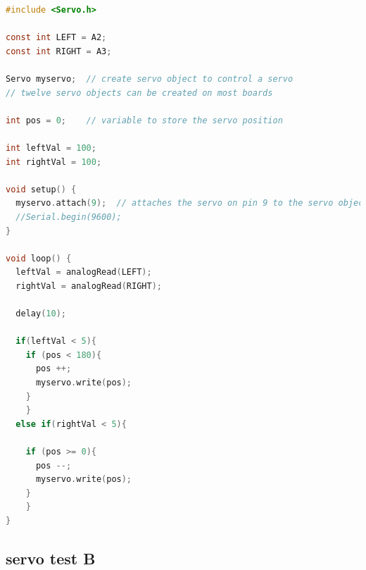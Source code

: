   \begin{lstlisting}[language=c,caption={Servo testing code A},label={lst:servo_test_a}]
#include <Servo.h>

const int LEFT = A2; 
const int RIGHT = A3;

Servo myservo;  // create servo object to control a servo
// twelve servo objects can be created on most boards

int pos = 0;    // variable to store the servo position

int leftVal = 100;    
int rightVal = 100; 

void setup() {
  myservo.attach(9);  // attaches the servo on pin 9 to the servo object
  //Serial.begin(9600);
}

void loop() {
  leftVal = analogRead(LEFT);
  rightVal = analogRead(RIGHT);

  delay(10);
  
  if(leftVal < 5){
    if (pos < 180){
      pos ++;
      myservo.write(pos); 
    }
    }
  else if(rightVal < 5){
  
    if (pos >= 0){
      pos --;
      myservo.write(pos); 
    }
    } 
}
\end{lstlisting}

\subsection*{servo test B}

